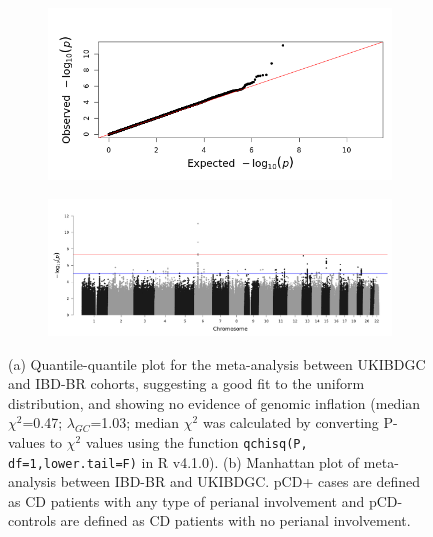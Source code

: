 \begin{figure}[H] 
  \centering   
  \begin{subfigure}[t]{1.0\textwidth}
    \centering   

    \includegraphics[width=1.0\textwidth]{Vector/ukibdgc_ibdbr_perianal_timesincediag5yrsctrl_allcase_meta_qq}

    
  \end{subfigure} 

    \begin{subfigure}[t]{1.0\textwidth}
      \centering   

      \includegraphics[width=1.0\textwidth]{Vector/ukibdgc_ibdbr_perianal_timesincediag5yrsctrl_allcase_meta}

      
  \end{subfigure} 
  \caption[Figure]{(a) Quantile-quantile plot for the meta-analysis between UKIBDGC and IBD-BR cohorts, suggesting a good fit to the uniform distribution, and showing no evidence of genomic inflation (median $\chi^{2}$=0.47; $\lambda_{GC}$=1.03; median $\chi^{2}$ was calculated by converting P-values to $\chi^{2}$  values using the function \Verb+qchisq(P, df=1,lower.tail=F)+ in R v4.1.0). (b) Manhattan plot of meta-analysis between IBD-BR and UKIBDGC. pCD+ cases are defined as CD patients with any type of perianal involvement and pCD- controls are defined as CD patients with no perianal involvement.}
  \label{fig:meta_qq_manhattan}
  \end{figure}

